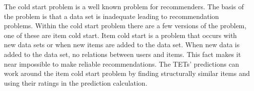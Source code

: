 The cold start problem is a well known problem for recommenders\cite{Ricci2015}\cite{saveski2014item}.
The basis of the problem is that a data set is 
inadequate leading to recommendation problems.
Within the cold start problem there are a few versions of the problem, one of these are item cold start.
Item cold start is a problem that occurs with new data sets or when new items are added to the data set.
When new data is added to the data set, no relations between users and items.
This fact makes it near impossible to make reliable recommendations.
The TETs' predictions can work around the item cold start problem by finding structurally similar items and using their ratings in the prediction calculation.
